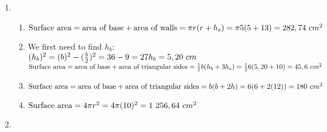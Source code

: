  \begin{solutions}{}{
\begin{enumerate}[itemsep=5pt, label=\textbf{\arabic*}. ] 
\item \begin{enumerate}[itemsep=5pt, label=\textbf{\alph*}.]
       \item $\text{Surface area} = \text{area of base} + \text{area of walls}\\
= \pi r(r + h_s)\\
=\pi 5(5 + 13) \\
= 282,74 ~cm^{2}$
  \item We first need to find $h_b$:\\
$(h_b)^2 = (b)^2 - (\frac{b}{2})^2 \\
= 36 - 9 \\
= 27 \\
h_b = 5,20 ~cm$\\
$\text{Surface area} = \text{area of base} + \text{area of triangular sides}\\
=\frac{1}{2}b(h_{b} + 3h_{s})\\
=\frac{1}{2}6(5,20 + 10)\\
= 45,6 ~cm^{2}$
  \item 
$\text{Surface area} = \text{area of base} + \text{area of triangular sides}\\
= b(b + 2h)\\
= 6(6 + 2(12)) \\
= 180~cm^2$
  \item $\text{Surface area} = 4 \pi r^2 \\
= 4 \pi (10)^2 \\
= 1~256,64 ~cm^2$
      \end{enumerate}
\item {}
\end{enumerate}}
\end{solutions}
